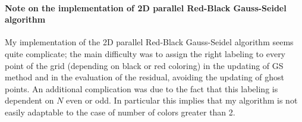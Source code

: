 \documentclass[a4paper,11pt]{article}
\theoremstyle{definition}
\theoremstyle{plain}
\theoremstyle{remark}
\begin{document}
\paragraph*{Note on the implementation of 2D parallel Red-Black Gauss-Seidel algorithm}

My implementation of the 2D parallel Red-Black Gauss-Seidel algorithm seems quite complicate; the main difficulty was to assign the right labeling to every point of the grid (depending on black or red coloring) in the updating of GS method and in the evaluation of the residual, avoiding the updating of ghost points. An additional complication was due to the fact that this labeling is dependent on $N$ even or odd. In particular this implies that my algorithm is not easily adaptable to the case of number of colors greater than 2.
\end{document}
